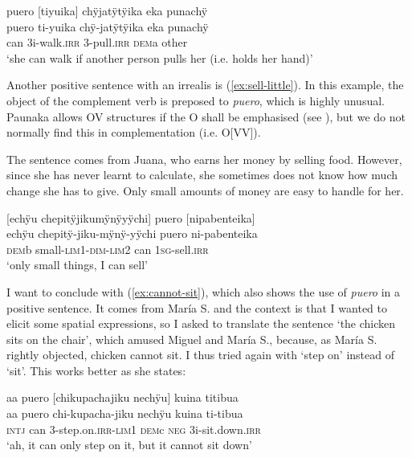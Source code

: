 \ea\label{ex:can-walk-grab}
\begingl
\glpreamble puero \textup{[}tiyuika\textup{]} chÿjatÿtÿika eka punachÿ\\
\gla puero ti-yuika chÿ-jatÿtÿika eka punachÿ\\
\glb can 3i-walk.\textsc{irr} 3-pull.\textsc{irr} \textsc{dem}a other\\
\glft ‘she can walk if another person pulls her (i.e. holds her hand)’
\endgl
\trailingcitation{[mxx-e110820ls.012]}
\xe

Another positive sentence with an irrealis  is (\ref{ex:sell-little}). In this example, the object of the complement verb is preposed to \textit{puero}, which is highly unusual. Paunaka allows OV structures if the O shall be emphasised (see ), but we do not normally find this in complementation (i.e. O[VV]).

The sentence comes from Juana, who earns her money by selling food. However, since she has never learnt to calculate, she sometimes does not know how much change she has to give. Only small amounts of money are easy to handle for her.

\ea\label{ex:sell-little}
\begingl
\glpreamble \textup{[}echÿu chepitÿjikumÿnÿyÿchi\textup{]} puero \textup{[}nipabenteika\textup{]}\\
\gla echÿu chepitÿ-jiku-mÿnÿ-yÿchi puero ni-pabenteika\\
\glb \textsc{dem}b small-\textsc{lim}1-\textsc{dim}-\textsc{lim}2 can 1\textsc{sg}-sell.\textsc{irr}\\
\glft ‘only small things, I can sell’
\endgl
\trailingcitation{[jxx-e110923l-2.150]}
\xe

I want to conclude with (\ref{ex:cannot-sit}), which also shows the use of \textit{puero} in a positive sentence. It comes from María S. and the context is that I wanted to elicit some spatial expressions, so I asked to translate the sentence ‘the chicken sits on the chair’, which amused Miguel and María S., because, as María S. rightly objected, chicken cannot sit. I thus tried again with ‘step on’ instead of ‘sit’. This works better as she states:

\ea\label{ex:cannot-sit}
\begingl
\glpreamble aa puero \textup{[}chikupachajiku nechÿu\textup{]} kuina titibua\\
\gla aa puero chi-kupacha-jiku nechÿu kuina ti-tibua\\
\glb \textsc{intj} can 3-step.on.\textsc{irr}-\textsc{lim}1 \textsc{dem}c \textsc{neg} 3i-sit.down.\textsc{irr}\\
\glft ‘ah, it can only step on it, but it cannot sit down’
\endgl
\trailingcitation{[rmx-e150922l.129]}
\xe
{}


